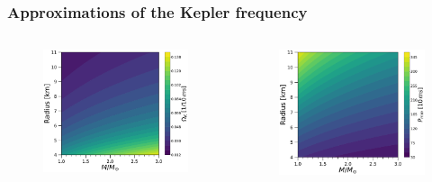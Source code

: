 \begin{frame}
\frametitle{Approximations of the Kepler frequency}

\begin{columns}
\begin{column}{0.5\textwidth}
	\begin{figure}
		\centering
		\includegraphics[width=0.95\linewidth]{./images/ns-m-radius-Omega_k.pdf}
	\end{figure}
\end{column}
\begin{column}{0.5\textwidth}
	\begin{figure}
		\centering
		\includegraphics[width=0.95\linewidth]{./images/ns-m-radius-P.pdf}
	\end{figure}
\end{column}
\end{columns}

\end{frame}


